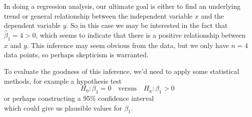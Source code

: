 \documentclass[10pt]{article}
\theoremstyle{definition}
\newcommand{\1}[1]{\textbf{1}_{\left[#1\right]}} %
\begin{document}
\begin{center}
\end{center}

In doing a regression analysis, our ultimate goal is either to find an
underlying trend or general relationship between the independent variable $x$
and the dependent variable $y$. So in this case we may be interested in the
fact that $\widehat{\beta}_{1}=4>0$, which seems to indicate that there is a
positive relationship between $x$ and $y$. This inference may seem obvious
from the data, but we only have $n=4$ data points, so perhaps skepticism is
warranted.

To evaluate the goodness of this inference, we'd need to apply some statistical
methods, for example a hypothesis test
\begin{equation*}
  H_{0}: \beta_{1}=0 \quad\text{versus}\quad H_{a}:\beta_{1}>0
\end{equation*}
or perhaps constructing a 95\% confidence interval
\begin{equation*}
  [\widehat{\beta}_{1}-\epsilon, \widehat{\beta}_{1}+\epsilon]
\end{equation*}
which could give us plausible values for $\beta_{1}$.
\end{document}
